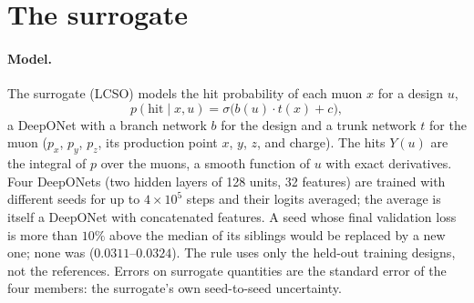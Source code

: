\documentclass[11pt,a4paper]{article}
\begin{document}
\section{The surrogate}
\label{sec:surrogate}

\paragraph{Model.}
The surrogate (LCSO) models the hit probability of each muon $x$ for a design $u$,
\begin{equation}
  p(\text{hit}\mid x,u) = \sigma\!\big(b(u)\cdot t(x) + c\big),
\end{equation}
a DeepONet with a branch network $b$ for the design and a trunk network $t$ for the muon
($p_x$, $p_y$, $p_z$, its production point $x$, $y$, $z$, and charge). The hits $Y(u)$ are the
integral of $p$ over the muons, a smooth function of $u$ with exact derivatives. Four DeepONets
(two hidden layers of 128 units, 32 features) are trained with different seeds for up to
$4\times10^5$ steps and their logits averaged; the average is itself a DeepONet with concatenated
features. A seed whose final validation loss is more than $10\%$ above the median of its siblings
would be replaced by a new one; none was ($0.0311$--$0.0324$). The rule uses only the held-out
training designs, not the references. Errors on surrogate quantities are the standard error of the
four members: the surrogate's own seed-to-seed uncertainty.
\end{document}
